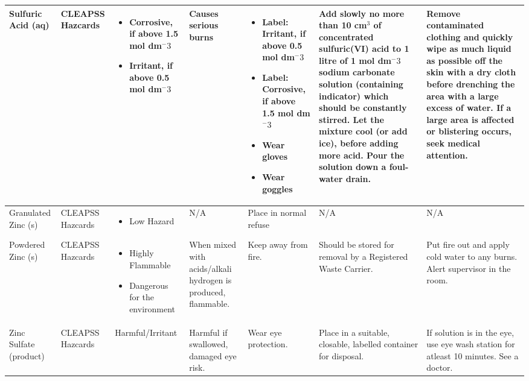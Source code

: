 \begin{landscape}
\begin{center}
\begin{longtable}{|p{1.5cm}|p{1.5cm}|p{3cm}|p{3cm}|p{3cm}|p{3cm}|p{2cm}|}
Sulfuric Acid (aq) &
CLEAPSS Hazcards &
\begin{itemize}
\item Corrosive, if above 1.5 mol dm$^-3$
\item Irritant, if above 0.5 mol dm$^-3$ \end{itemize} &
Causes serious burns & 
\begin{itemize}
\item Label: Irritant, if above 0.5 mol dm$^-3$
\item Label: Corrosive, if above 1.5 mol dm$^-3$
\item Wear gloves
\item Wear goggles \end{itemize} &
Add slowly no more than 10 cm$^3$ of concentrated sulfuric(VI) acid to 1 litre of 1 mol dm$^-3$ sodium carbonate solution (containing indicator) which should be constantly stirred. Let the mixture cool (or add ice), before adding more acid. Pour the solution down a foul-water drain. & 
Remove contaminated clothing and quickly wipe as much liquid as possible off the skin with a dry cloth before drenching the area with a large excess of water. If a large area is affected or blistering occurs, seek medical attention. \\ \hline

Granulated Zinc (s) &
CLEAPSS Hazcards &
\begin{itemize}
\item Low Hazard \end{itemize} &
N/A &
Place in normal refuse &
N/A &
N/A \\ \hline

Powdered Zinc (s) &
CLEAPSS Hazcards &
\begin{itemize}
\item Highly Flammable
\item Dangerous for the environment \end{itemize} &
When mixed with acids/alkali hydrogen is produced, flammable. &
Keep away from fire. &
Should be stored for removal by a Registered Waste Carrier. &
Put fire out and apply cold water to any burns. Alert supervisor in the room.
\\ \hline 

Zinc Sulfate (product) &
CLEAPSS Hazcards
& Harmful/Irritant
&Harmful if swallowed, damaged eye risk.
& Wear eye protection.
& Place in a suitable, closable, labelled container for disposal.
& If solution is in the eye, use eye wash station for atleast 10 minutes. See a doctor. 


\end{longtable}
\end{center}
\end{landscape}
